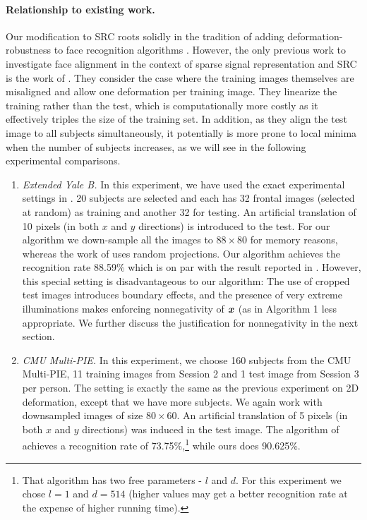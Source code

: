\paragraph{Relationship to existing work.} 
Our modification to SRC roots solidly in the tradition of adding deformation-robustness to face recognition algorithms \cite{Cootes2001-PAMI,Gross2006-PAMI,Wiskott1997-PAMI}. However, the only previous work to investigate face alignment in the context of sparse signal representation and SRC is the work of \cite{Huang2008-CVPR}. They consider the case where the training images themselves are misaligned and allow one deformation per training image. They linearize the training rather than the test, which is computationally more costly as it effectively triples the size of the training set. In addition, as they align the test image to all subjects simultaneously, it potentially is more prone to local minima when the number of subjects increases, as we will see in the following experimental comparisons. \vspace{0mm}
\begin{enumerate}
\item {\em Extended Yale B.} In this experiment, we have used the exact experimental settings in \cite{Huang2008-CVPR}. 
20 subjects are selected and each has 32 frontal images (selected at random) as training and another 32 for testing. An artificial translation
of 10 pixels (in both $x$ and $y$ directions) is introduced to the test. For our algorithm we down-sample all the images
to $88\times 80$ for memory reasons, whereas the work of \cite{Huang2008-CVPR} uses random projections. Our algorithm achieves the recognition rate 88.59\% which is on par with the result reported in \cite{Huang2008-CVPR}.
However, this special setting is disadvantageous to our algorithm: The use of cropped test images introduces boundary effects, and the presence of very extreme illuminations makes enforcing nonnegativity of ${\boldsymbol{x}}$ (as in Algorithm 1 less appropriate. We further discuss the justification for nonnegativity in the next section.\vspace{0mm}
\item {\em CMU Multi-PIE.} In this experiment, we choose 160 subjects from the CMU Multi-PIE, 11 training images from Session 2
and 1 test image from Session 3 per person. The setting is exactly the same as the previous experiment on 2D deformation, 
except that we have more subjects. We again 
work with downsampled images of size $80\times 60$. An artificial translation of 5 
pixels (in both $x$ and $y$ directions) was induced in the test image. The algorithm of \cite{Huang2008-CVPR} achieves
a recognition rate of 73.75\%,\footnote{That algorithm has two free parameters - $l$ and $d$. For this experiment we chose 
$l = 1$ and $d = 514$ (higher values may get a better recognition rate at the expense of higher running time).
} while ours does 90.625\%. \end{enumerate}\vspace{0mm}
				
